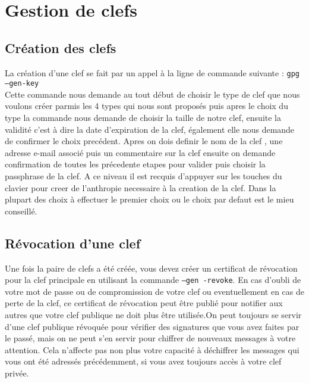
\section{Gestion de clefs}
\subsection{Création des clefs}
 La création d'une clef se fait par un appel à la ligne de commande suivante : \texttt{gpg --gen-key}\\
Cette commande nous demande au tout début de choisir le type de clef que nous voulons créer parmis les 4 types qui nous sont
proposés puis apres le choix du type la commande nous demande de choisir la taille de notre clef, ensuite la validité
c'est à dire la date d'expiration de la clef, également elle nous demande de confirmer le choix precédent.
Apres on dois definir le nom de la clef , une adresse e-mail associé puis un commentaire sur la clef ensuite on demande confirmation de
toutes les précedente etapes pour valider puis choisir la passphrase de la clef.
A ce niveau il est recquis d'appuyer sur les touches du clavier pour creer de l'anthropie necessaire à la creation de la clef.
Dans la plupart des choix à effectuer le premier choix ou le choix par defaut est le mieu conseillé.

\subsection{Révocation d'une clef}
 Une fois la paire de clefs a été créée, vous devez créer un certificat de révocation pour la clef principale en utilisant la commande \texttt
{--gen -revoke}. En cas d'oubli de votre mot de passe ou de compromission de votre clef ou eventuellement en cas de perte de la clef, ce certificat de révocation peut être publié pour notifier aux autres que votre clef publique ne doit plus être utilisée.On peut toujours se servir d'une clef publique révoquée pour vérifier des signatures que vous avez faites par le passé, mais on ne peut s'en servir pour chiffrer de nouveaux messages à votre attention. Cela n'affecte pas non plus votre capacité à déchiffrer les messages qui vous ont été adressés précédemment, si vous avez toujours accès à votre clef privée.
